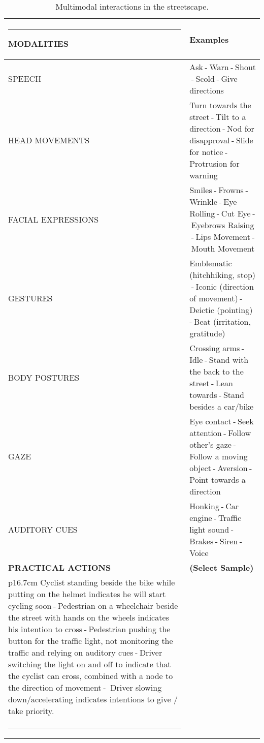 \documentclass[a4paper]{article}
\makeatletter
\def\hlinewd#1{%
  \noalign{\ifnum0=`}\fi\hrule \@height #1 \futurelet
   \reserved@a\@xhline}
\makeatother
\begin{document}
 
  {
 \begin{table}[t]
\renewcommand{\arraystretch}{1.2}
 \begin{center}
 \scriptsize\sffamily
\begin{tabular}{>{\columncolor[gray]{0.98}}l p{13.5cm}}
 \hlinewd{1pt}
\rowcolor[gray]{.92} \textbf{MODALITIES} & \textbf{Examples} \\\hline
 
SPEECH & Ask$~$-$~$Warn$~$-$~$Shout$~$-$~$Scold$~$-$~$Give directions \\
HEAD MOVEMENTS  & Turn towards the street$~$-$~$Tilt to a direction$~$-$~$Nod for disapproval$~$-$~$Slide for notice$~$-$~$Protrusion for warning \\
FACIAL EXPRESSIONS & Smiles$~$-$~$Frowns$~$-$~$Wrinkle$~$-$~$Eye Rolling$~$-$~$Cut Eye$~$-$~$Eyebrows Raising$~$-$~$Lips Movement$~$-$~$Mouth Movement\\
GESTURES & Emblematic (hitchhiking, stop)$~$-$~$Iconic (direction of movement)$~$-$~$Deictic (pointing)$~$-$~$Beat (irritation, gratitude)\\
BODY POSTURES  & Crossing arms$~$-$~$Idle$~$-$~$Stand with the back to the street$~$-$~$Lean towards$~$-$~$Stand besides a car/bike  \\
GAZE   & Eye contact$~$-$~$Seek attention$~$-$~$Follow other's gaze$~$-$~$Follow a moving object$~$-$~$Aversion$~$-$~$Point towards a direction \\
AUDITORY CUES  & Honking$~$-$~$Car engine$~$-$~$Traffic light sound$~$-$~$Brakes$~$-$~$Siren$~$-$~$Voice  \\
\hline
\rowcolor[gray]{.92} \textbf{PRACTICAL ACTIONS} & \textbf{(Select Sample)} \\\hline
 \multicolumn{2} {p{16.7cm}} {Cyclist standing beside the bike while putting on the helmet indicates he will start cycling soon$~$-$~$Pedestrian on a wheelchair beside the street  with    hands on the wheels indicates his intention to cross$~$-$~$Pedestrian pushing the button for the traffic light, not monitoring the traffic and relying on auditory cues$~$-$~$Driver switching the light on and off to indicate that the cyclist can cross, combined with a node to the direction of movement$~$-$~$ Driver  slowing down/accelerating indicates intentions to give / take priority.    }   \\

 \hlinewd{1pt}
 \end{tabular}
 \caption{{\sffamily\small Multimodal interactions in the streetscape.}}
 \label{multimodal_interactions}
\end{center}
\end{table}
 }
 
\end{document}
